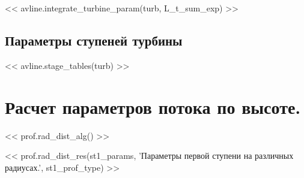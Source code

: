 \documentclass[a4paper,10pt]{article}
\begin{document}
    << avline.integrate_turbine_param(turb, L_t_sum_exp) >>

    \subsection{Параметры ступеней турбины}
    << avline.stage_tables(turb) >>

    \section{Расчет параметров потока по высоте.}

    << prof.rad_dist_alg() >>

    << prof.rad_dist_res(st1_params, 'Параметры первой ступени на различных радиусах.', st1_prof_type) >>
\end{document}
